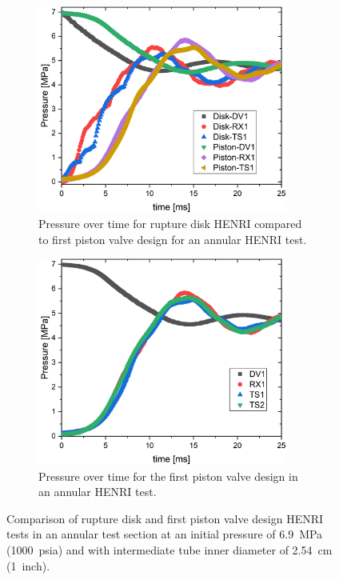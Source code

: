 \begin{figure}[tb]
    \vspace{16pt}
    \centering
    \begin{subfigure}[t]{0.45\textwidth}
        \centering
        \includegraphics[width=0.9\textwidth]{results/plots/1000psi_ann_BD_Pis_over.png}
        \caption{Pressure over time for rupture disk HENRI compared to first piston valve design for an annular HENRI test.}
        \label{fig:mtm disk}
    \end{subfigure}
    \hfill
    \begin{subfigure}[t]{0.45\textwidth}
        \centering
        \includegraphics[width=0.9\textwidth]{results/plots/1000psi_MtMseal_25.png}
        \caption{Pressure over time for the first piston valve design in an annular HENRI test.}
        \label{fig:piston metal 1000psi}
    \end{subfigure}
    
    \caption{Comparison of rupture disk and first piston valve design HENRI tests in an annular test section at an initial pressure of \SI{6.9}{\mega\pascal} (\SI{1000}{psia}) and with intermediate tube inner diameter of \SI{2.54}{\centi\meter} (\SI{1}{inch}).}
    \label{fig:piston v disk}
    \vspace{16pt}
\end{figure}


